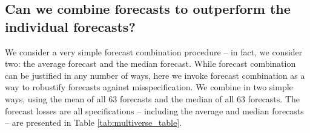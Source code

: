 \documentclass{uiucthesis2021}
\theoremstyle{definition}
\begin{document}


\subsection{Can we combine forecasts to outperform the individual forecasts?}\label{forecastcomb}

We consider a very simple forecast combination procedure -- in fact, we consider two: the average forecast and the median forecast.  While forecast combination can be justified in any number of ways, here we invoke forecast combination as a way to robustify forecasts against misspecification.  We combine in two simple ways, using the mean of all 63 forecasts and the median of all 63 forecasts.  The forecast losses are all specifications -- including the average and median forecasts -- are presented in Table \ref{tab:multiverse_table}.
\end{document}
